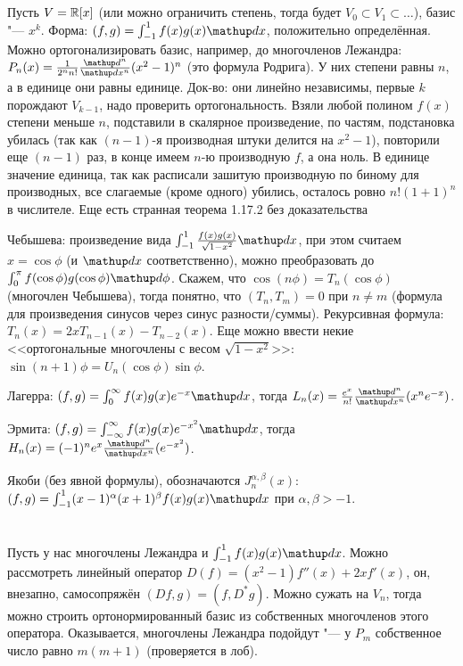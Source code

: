 \section{} %
Пусть $V=\mathbb{R}[x]$ (или можно ограничить степень, тогда будет $V_0 \subset V_1 \subset \dots$), базис "--- $x^k$.
Форма: $(f, g) = \int_{-1}^1 f(x)g(x) \d x$, положительно определённая.
Можно ортогонализировать базис, например, до многочленов Лежандра: $P_n(x) = \frac{1}{2^nn!}\frac{\d^n}{\d x^n}(x^2-1)^n$ (это формула Родрига).
У них степени равны $n$, а в единице они равны единице.
Док-во: они линейно независимы, первые $k$ порождают $V_{k-1}$, надо проверить ортогональность.
Взяли любой полином $f(x)$ степени меньше $n$, подставили в скалярное произведение,
по частям, подстановка убилась (так как $(n-1)$-я производная штуки делится на $x^2-1$),
повторили еще $(n-1)$ раз, в конце имеем $n$-ю производную $f$, а она ноль.
В единице значение единица, так как расписали зашитую производную по биному для производных, все слагаемые (кроме одного) убились, осталось ровно $n!(1+1)^n$ в числителе.
Еще есть странная теорема 1.17.2 без доказательства \TODO

Чебышева: произведение вида $\int_{-1}^1 \frac{f(x)g(x)}{\sqrt{1 - x^2}} \d x$, при этом считаем $x=\cos \phi$ (и $\d x$ соответственно),
можно преобразовать до $\int_0^{\pi} f(\cos \phi)g(\cos \phi) \d \phi$.
Скажем, что $\cos(n\phi)=T_n(\cos\phi)$ (многочлен Чебышева), тогда понятно, что $(T_n, T_m)=0$ при $n \ne m$ (формула для произведения синусов через синус разности/суммы).
Рекурсивная формула: $T_n(x)=2xT_{n-1}(x)-T_{n-2}(x)$.
Еще можно ввести некие <<ортогональные многочлены с весом $\sqrt{1-x^2}$>>: $\sin(n+1)\phi = U_n(\cos \phi)\sin \phi$.

Лагерра: $(f,g)=\int_0^\infty f(x)g(x)e^{-x}\d x$, тогда $L_n(x)=\frac{e^x}{n!}\frac{\d^n}{\d x^n}(x^ne^{-x})$.

Эрмита: $(f, g)=\int_{-\infty}^\infty f(x)g(x)e^{-x^2}\d x$, тогда $H_n(x) = (-1)^n e^x \frac{\d^n}{\d x^n}(e^{-x^2})$.

Якоби (без явной формулы), обозначаются $J_n^{\alpha,\beta}(x)$: $(f, g)=\int_{-1}^1 (x-1)^\alpha(x+1)^\beta f(x) g(x) \d x$ при $\alpha, \beta > -1$.

\section{} %
Пусть у нас многочлены Лежандра и $\int_{-1}^1 f(x)g(x) \d x$.
Можно рассмотреть линейный оператор $D(f)=(x^2-1)f''(x)+2xf'(x)$, он, внезапно, самосопряжён $(Df, g)=(f, D^*g)$.
Можно сужать на $V_n$, тогда можно строить ортонормированный базис из собственных многочленов этого оператора.
Оказывается, многочлены Лежандра подойдут "--- у $P_m$ собственное число равно $m(m+1)$ (проверяется в лоб).
\TODO

